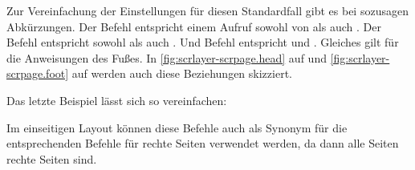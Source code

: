 Zur Vereinfachung der Einstellungen für diesen Standardfall gibt es bei
 sozusagen Abkürzungen. Der Befehl 
entspricht einem Aufruf sowohl von  als auch
. Der Befehl  entspricht sowohl
 als auch . Und
Befehl  entspricht  und
. Gleiches gilt für die Anweisungen des
Fußes. In \autoref{fig:scrlayer-scrpage.head} auf
 und
\autoref{fig:scrlayer-scrpage.foot} auf
 werden auch diese Beziehungen
skizziert.
%
\begin{Example}
  \iftrue%
  Das letzte Beispiel lässt sich so vereinfachen:
  \else
  Mit Hilfe der neuen Befehle, lässt sich das letzte Beispiel wie folgt
  vereinfachen:
  \fi
{}
\iffalse%
  Wie zusehen ist, konnte die Hälfte der Befehle eingespart und trotzdem
  dasselbe Ergebnis erzielt werden.
\fi
\end{Example}%

\iffalse%
Da im einseitigen Layout alle Seiten als ungerade oder rechte Seiten behandelt
werden, können \iffree{im einseitigen Layout}{dann} diese Befehle auch als
Synonyme für die entsprechenden Befehle für rechte Seiten verwendet werden.%
\else%
Im einseitigen Layout können diese Befehle auch als Synonym für die
entsprechenden Befehle für rechte Seiten verwendet werden, da dann alle Seiten
rechte Seiten sind.%
\fi%
\iffalse%
In den meisten Fällen wird man daher eher diese sechs als die zwölf zuvor
vorgestellten Befehle verwenden.
\fi

